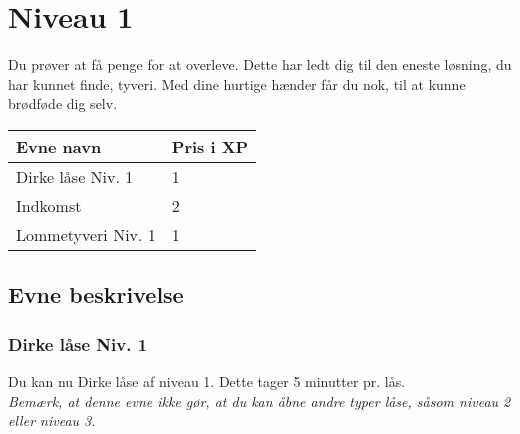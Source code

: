 \chapter*{Niveau 1}
Du prøver at få penge for at overleve. Dette har ledt dig til den eneste løsning, du har kunnet finde, tyveri. Med dine hurtige hænder får du nok, til at kunne brødføde dig selv.
\begin{table}[H]
    \centering
    \begin{tabular}{|p{}|p{}|}
    \rowcolor{cerulean!80}\hline
        Evne navn & Pris i XP \\\hline
         Dirke låse Niv. 1 & 1 \\\hline
         Indkomst & 2 \\\hline
         Lommetyveri Niv. 1 & 1\\
         \hline
    \end{tabular}
\end{table}


\section*{Evne beskrivelse}

\subsection*{Dirke låse Niv. 1}
Du kan nu Dirke låse af niveau 1. Dette tager 5 minutter pr. lås.\\
\emph{Bemærk, at denne evne ikke gør, at du kan åbne andre typer låse, såsom niveau 2 eller niveau 3.}\\



